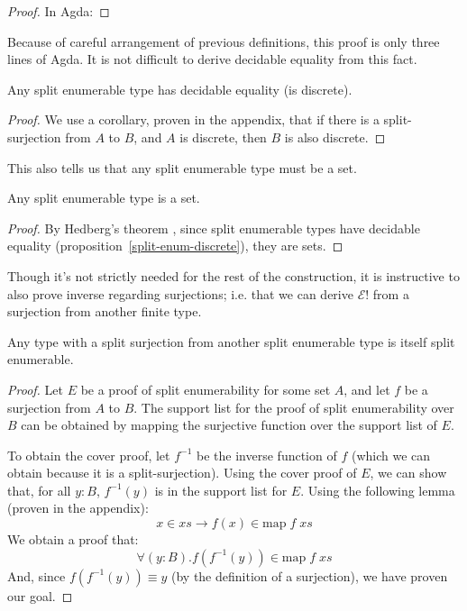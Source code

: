 \begin{refsection}
\begin{proof}
  In Agda:
\end{proof}

Because of careful arrangement of previous definitions, this proof is only three
lines of Agda.
It is not difficult to derive decidable equality from this fact.
\begin{lemma} \label{split-enum-discrete}
  Any split enumerable type has decidable equality (is discrete).
\end{lemma}
\begin{proof}
  We use a corollary, proven in the appendix, that if there is a
  split-surjection from \(A\) to \(B\), and \(A\) is discrete, then \(B\) is
  also discrete.
\end{proof}

This also tells us that any split enumerable type must be a set.
\begin{lemma}
  Any split enumerable type is a set.
\end{lemma}
\begin{proof}
  By Hedberg's theorem \cite{hedbergCoherenceTheoremMartinLof1998}, since split
  enumerable types have decidable equality
  (proposition~\ref{split-enum-discrete}), they are sets.
\end{proof}

Though it's not strictly needed for the rest of the construction, it is
instructive to also prove inverse regarding surjections; i.e. that we can
derive \(\mathcal{E}!\) from a surjection from another finite type.
\begin{lemma} \label{split-enum-from-surj}
  Any type with a split surjection from another split enumerable type is itself
  split enumerable.
\end{lemma}
\begin{proof}
  Let \(E\) be a proof of split enumerability for some set \(A\), and let \(f\)
  be a surjection from \(A\) to \(B\).
  The support list for the proof of split enumerability over \(B\) can be
  obtained by mapping the surjective function over the support list of \(E\).

  To obtain the cover proof, let \(f^{-1}\) be the inverse function of \(f\)
  (which we can obtain because it is a split-surjection).
  Using the cover proof of \(E\), we can show that, for all \(y : B\), \(f^{-1}(y)\)
  is in the support list for \(E\).
  Using the following lemma (proven in the appendix):
  \begin{equation}
    x \in xs \rightarrow f (x) \in \text{map} \; f \; \mathit{xs}
  \end{equation}
  We obtain a proof that:
  \begin{equation}
    \forall (y : B). f (f^{-1}(y)) \in \text{map} \; f \; \mathit{xs}
  \end{equation}
  And, since \(f (f^{-1}(y)) \equiv y\) (by the definition of a surjection), we
  have proven our goal.


\end{proof}
\end{refsection}
